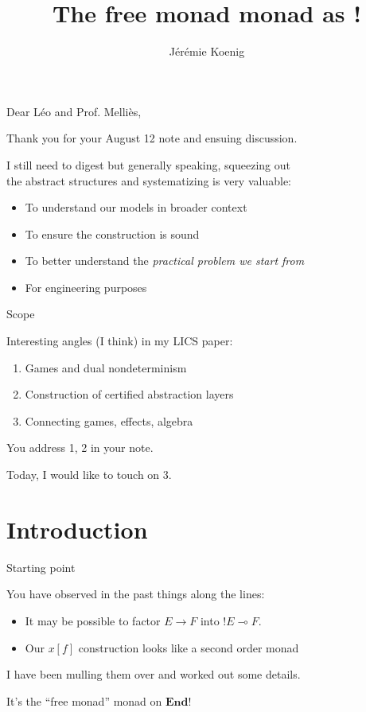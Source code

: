 \documentclass{beamer}
\title{The free monad monad as {!}}
\author{J\'er\'emie Koenig}
\begin{document}
\maketitle

\begin{frame}{} %

  Dear L\'eo and Prof. Melli\`es,

  Thank you for your August 12 note and ensuing discussion.

  I still need to digest but generally speaking,
  squeezing out \\ the abstract structures and systematizing is very valuable:
  \begin{itemize}
    \item To understand our models in broader context
    \item To ensure the construction is sound
    \item To better understand the \emph{practical problem we start from}
    \item For engineering purposes
  \end{itemize}

\end{frame}

\begin{frame}{Scope} %

  Interesting angles (I think) in my LICS paper:
  \begin{enumerate}
    \item Games and dual nondeterminism
    \item Construction of certified abstraction layers
    \item Connecting games, effects, algebra
  \end{enumerate}

  You address {1}, {2} in your note.

  Today, I would like to touch on {3}.

\end{frame}

\section{Introduction}
\frame{\sectionpage}

\begin{frame}{Starting point} %

  You have observed in the past things along the lines:
  \begin{itemize}
    \item It may be possible to factor $E \rightarrow F$
      into ${!E} \multimap F$.
    \item Our $x[f]$ construction looks like a second order monad
  \end{itemize}

  I have been mulling them over and worked out some details.

  It's the ``free monad'' monad on $\mathbf{End}$!

\end{frame}
\end{document}
